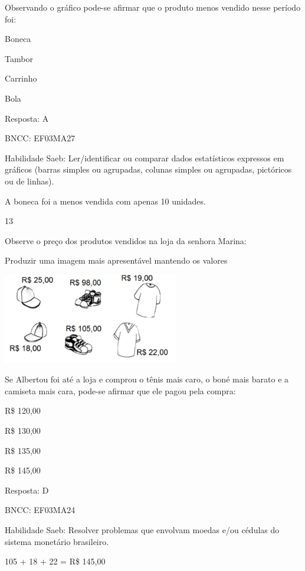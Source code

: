 \begin{escolha}
{\begin{escolha}
{Observando o gráfico pode-se afirmar que o produto menos vendido nesse
período foi:

\begin{escolha}

\item
  Boneca
\item
  Tambor
\item
  Carrinho
\item
  Bola
\end{escolha}

Resposta: A

BNCC: EF03MA27

Habilidade Saeb: Ler/identificar ou comparar dados estatísticos
expressos em gráficos (barras simples ou agrupadas, colunas simples ou
agrupadas, pictóricos ou de linhas).

A boneca foi a menos vendida com apenas 10 unidades.

\num{13}

Observe o preço dos produtos vendidos na loja da senhora Marina:

Produzir uma imagem mais apresentável mantendo os valores

\includegraphics[width=3.02451in,height=1.54853in]{media/image138.png}

Se Albertou foi até a loja e comprou o tênis mais caro, o boné mais
barato e a camiseta mais cara, pode-se afirmar que ele pagou pela
compra:

\begin{escolha}

\item
  R\$ 120,00
\item
  R\$ 130,00
\item
  R\$ 135,00
\item
  R\$ 145,00
\end{escolha}

Resposta: D

BNCC: EF03MA24

Habilidade Saeb: Resolver problemas que envolvam moedas e/ou cédulas do
sistema monetário brasileiro.

105 + 18 + 22 = R\$ 145,00

}
\end{escolha}}
\end{escolha}
